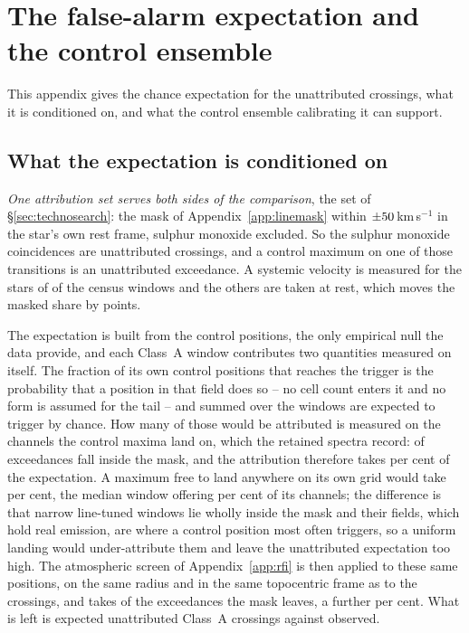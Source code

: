 \section{The false-alarm expectation and the control ensemble}
\label{app:falsealarm}

This appendix gives the chance expectation for the unattributed crossings,
what it is conditioned on, and what the control ensemble calibrating it can
support.

\subsection{What the expectation is conditioned on}

\emph{One attribution set serves both sides of the comparison}, the set of
\S\ref{sec:technosearch}: the mask of Appendix~\ref{app:linemask} within
$\pm50$\,km\,s$^{-1}$ in the star's own rest frame, sulphur monoxide
excluded. So the \MkNSODecide{} sulphur monoxide coincidences are unattributed
crossings, and a control maximum on one of those transitions is an
unattributed exceedance. A systemic velocity is measured for the stars of
\CeNVsys{} of the census windows and the others are taken at rest, which moves
the masked share by \CeVsysSensPct{} points.

The expectation is built from the control positions, the only empirical null
the data provide, and each Class~A window contributes two quantities
measured on itself. The fraction of its own \NCtrl{} control positions that
reaches the trigger is the probability that a position in that field does so
-- no cell count enters it and no form is assumed for the tail -- and
summed over the windows \CeExpTrig{} are expected to trigger by chance. How
many of those would be attributed is measured on the channels the control
maxima land on, which the retained spectra record: \CeNExcAttr{} of
\CeNExc{} exceedances fall inside the mask, and the attribution therefore
takes \CeMaskPct{} per cent of the expectation. A maximum free to land
anywhere on its own grid would take \CeUnifPct{} per cent, the median window
offering \CeMaskPctMed{} per cent of its channels; the difference is that
\CeNFullMask{} narrow line-tuned windows lie wholly inside the mask and
their fields, which hold real emission, are where a control position most
often triggers, so a uniform landing would under-attribute them and leave
the unattributed expectation too high. The atmospheric screen of
Appendix~\ref{app:rfi} is then applied to these same positions, on the same
radius and in the same topocentric frame as to the crossings, and takes
\CeTlCtrlCut{} of the \CeTlCtrlSurv{} exceedances the mask leaves, a further
\CeTlPct{} per cent. What is
left is \CeExp{} expected unattributed Class~A crossings against \CeObs{}
observed.

